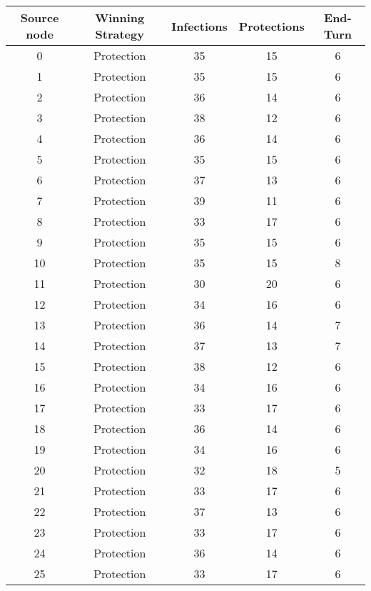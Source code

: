 \documentclass[results.tex]{subfiles}
\begin{document}
\begin{center}
  \begin{tabular}{| c || c | c | c | c |}
    \hline
    {\bfseries Source node} & {\bfseries Winning Strategy} & {\bfseries Infections} & {\bfseries Protections} & {\bfseries End-Turn} \\  %
    \hline\hline
    0 & Protection & 35 & 15 & 6 \\ 
    \hline
    1 & Protection & 35 & 15 & 6 \\ 
    \hline
    2 & Protection & 36 & 14 & 6 \\ 
    \hline
    3 & Protection & 38 & 12 & 6 \\ 
    \hline
    4 & Protection & 36 & 14 & 6 \\ 
    \hline
    5 & Protection & 35 & 15 & 6 \\ 
    \hline
    6 & Protection & 37 & 13 & 6 \\ 
    \hline
    7 & Protection & 39 & 11 & 6 \\ 
    \hline
    8 & Protection & 33 & 17 & 6 \\ 
    \hline
    9 & Protection & 35 & 15 & 6 \\ 
    \hline
    10 & Protection & 35 & 15 & 8 \\ 
    \hline
    11 & Protection & 30 & 20 & 6 \\ 
    \hline
    12 & Protection & 34 & 16 & 6 \\ 
    \hline
    13 & Protection & 36 & 14 & 7 \\ 
    \hline
    14 & Protection & 37 & 13 & 7 \\ 
    \hline
    15 & Protection & 38 & 12 & 6 \\ 
    \hline
    16 & Protection & 34 & 16 & 6 \\ 
    \hline
    17 & Protection & 33 & 17 & 6 \\ 
    \hline
    18 & Protection & 36 & 14 & 6 \\ 
    \hline
    19 & Protection & 34 & 16 & 6 \\ 
    \hline
    20 & Protection & 32 & 18 & 5 \\ 
    \hline
    21 & Protection & 33 & 17 & 6 \\ 
    \hline
    22 & Protection & 37 & 13 & 6 \\ 
    \hline
    23 & Protection & 33 & 17 & 6 \\ 
    \hline
    24 & Protection & 36 & 14 & 6 \\ 
    \hline
    25 & Protection & 33 & 17 & 6 \\ 

\end{tabular}
\end{center}
\end{document}
